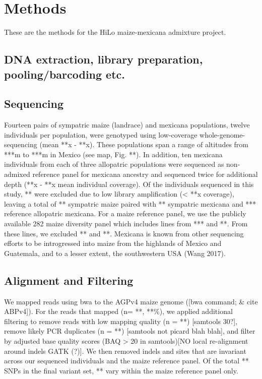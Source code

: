 \documentclass[12pt]{report}
\begin{document}
\section{Methods}
These are the methods for the HiLo maize-mexicana admixture project.

\subsection{DNA extraction, library preparation, pooling/barcoding etc.}
\subsection{Sequencing}
Fourteen pairs of sympatric maize (landrace) and mexicana populations, twelve individuals per population, were genotyped using low-coverage whole-genome-sequencing (mean **x - **x). These populations span a range of altitudes from ***m to ***m in Mexico (see map, Fig. **). In addition, ten mexicana individuals from each of three allopatric populations were sequenced as non-admixed reference panel for mexicana ancestry and sequenced twice for additional depth (**x - **x mean individual coverage). Of the individuals sequenced in this study, ** were excluded due to low library amplification (< **x coverage), leaving a total of ** sympatric maize paired with ** sympatric mexicana and *** reference allopatric mexicana. For a maize reference panel, we use the publicly available 282 maize diversity panel which includes lines from *** and **. From these lines, we excluded ** and **. Mexicana is known from other sequencing efforts to be introgressed into maize from the highlands of Mexico and Guatemala, and to a lesser extent, the southwestern USA (Wang 2017). \par
\subsection{Alignment and Filtering}
We mapped reads using bwa to the AGPv4 maize genome ([bwa command; \& cite ABPv4]). For the reads that mapped (n= **, **\%), we applied additional filtering to remove reads with low mapping quality (n = **) [samtools 30?], remove likely PCR duplicates (n = **) [samtools not picard blah blah], and filter by adjusted base quality scores (BAQ > 20 in samtools)[NO local re-alignment around indels GATK (?)]. We then removed indels and sites that are invariant across our sequenced individuals and the maize reference panel. Of the total ** SNPs in the final variant set, ** vary within the maize reference panel only.
\end{document}
